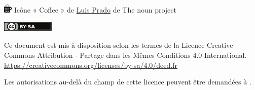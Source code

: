\includegraphics[width=4mm]{icon/java}
Icône « Coffee » de 
\href{https://thenounproject.com/Luis}{Luis Prado} de
The noun project




\vspace{1cm}
\includegraphics[width=25mm]{images/cc-by-sa}

Ce document est mis à disposition selon les termes de la Licence Creative
\\Commons Attribution - Partage dans les Mêmes Conditions 4.0 International.
\\\url{https://creativecommons.org/licenses/by-sa/4.0/deed.fr}

Les autorisations au-delà du champ de cette licence
peuvent être demandées à \texttt{\contact}.

